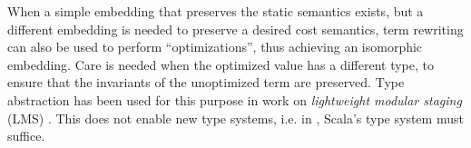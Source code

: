 \documentclass[10pt,preprint]{sigplanconf}
\begin{document}


When a simple embedding that preserves the static semantics exists, but a different  embedding is needed to preserve a desired cost semantics, term rewriting  can also be used to perform ``optimizations'', thus achieving an isomorphic embedding. Care is needed when the optimized value has a different type, to ensure that the invariants of the unoptimized term are preserved. Type abstraction has been used for this purpose in work on \emph{lightweight modular staging} (LMS) \cite{Rompf:2012:LMS}. This does not enable new type systems, i.e. in \cite{Rompf:2012:LMS}, Scala's type system must suffice. %
\end{document}
